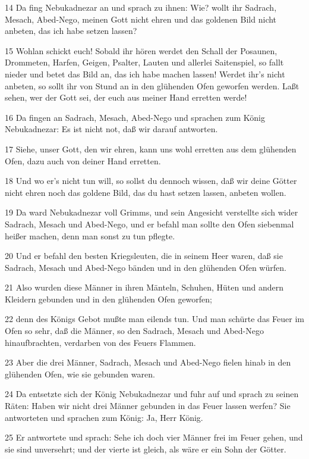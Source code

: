 \par 14 Da fing Nebukadnezar an und sprach zu ihnen: Wie? wollt ihr Sadrach, Mesach, Abed-Nego, meinen Gott nicht ehren und das goldenen Bild nicht anbeten, das ich habe setzen lassen?
\par 15 Wohlan schickt euch! Sobald ihr hören werdet den Schall der Posaunen, Drommeten, Harfen, Geigen, Psalter, Lauten und allerlei Saitenspiel, so fallt nieder und betet das Bild an, das ich habe machen lassen! Werdet ihr's nicht anbeten, so sollt ihr von Stund an in den glühenden Ofen geworfen werden. Laßt sehen, wer der Gott sei, der euch aus meiner Hand erretten werde!
\par 16 Da fingen an Sadrach, Mesach, Abed-Nego und sprachen zum König Nebukadnezar: Es ist nicht not, daß wir darauf antworten.
\par 17 Siehe, unser Gott, den wir ehren, kann uns wohl erretten aus dem glühenden Ofen, dazu auch von deiner Hand erretten.
\par 18 Und wo er's nicht tun will, so sollst du dennoch wissen, daß wir deine Götter nicht ehren noch das goldene Bild, das du hast setzen lassen, anbeten wollen.
\par 19 Da ward Nebukadnezar voll Grimms, und sein Angesicht verstellte sich wider Sadrach, Mesach und Abed-Nego, und er befahl man sollte den Ofen siebenmal heißer machen, denn man sonst zu tun pflegte.
\par 20 Und er befahl den besten Kriegsleuten, die in seinem Heer waren, daß sie Sadrach, Mesach und Abed-Nego bänden und in den glühenden Ofen würfen.
\par 21 Also wurden diese Männer in ihren Mänteln, Schuhen, Hüten und andern Kleidern gebunden und in den glühenden Ofen geworfen;
\par 22 denn des Königs Gebot mußte man eilends tun. Und man schürte das Feuer im Ofen so sehr, daß die Männer, so den Sadrach, Mesach und Abed-Nego hinaufbrachten, verdarben von des Feuers Flammen.
\par 23 Aber die drei Männer, Sadrach, Mesach und Abed-Nego fielen hinab in den glühenden Ofen, wie sie gebunden waren.
\par 24 Da entsetzte sich der König Nebukadnezar und fuhr auf und sprach zu seinen Räten: Haben wir nicht drei Männer gebunden in das Feuer lassen werfen? Sie antworteten und sprachen zum König: Ja, Herr König.
\par 25 Er antwortete und sprach: Sehe ich doch vier Männer frei im Feuer gehen, und sie sind unversehrt; und der vierte ist gleich, als wäre er ein Sohn der Götter.
